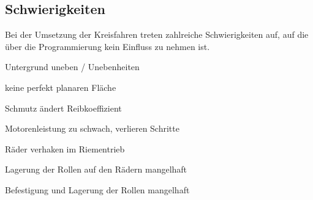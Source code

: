 \documentclass[a4paper]{article}
\begin{document}
\subsection{Schwierigkeiten}
Bei der Umsetzung der Kreisfahren treten zahlreiche Schwierigkeiten auf, auf die über die Programmierung kein Einfluss zu nehmen ist.
\begin{compactitem}
    \item Untergrund uneben / Unebenheiten
    \item keine perfekt planaren Fläche
    \item Schmutz ändert Reibkoeffizient
    \item Motorenleistung zu schwach, verlieren Schritte
    \item Räder verhaken im Riementrieb
    \item Lagerung der Rollen auf den Rädern mangelhaft
    \item Befestigung und Lagerung der Rollen mangelhaft
\end{compactitem}
\end{document}
